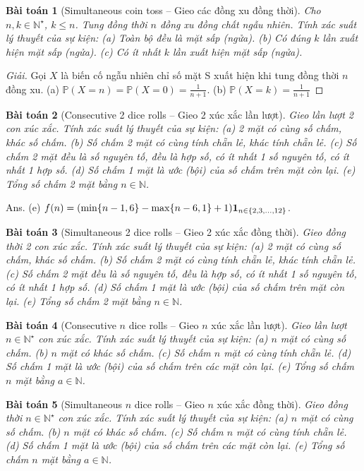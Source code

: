 \documentclass{article}
\newtheorem{baitoan}{Bài toán}
\begin{document}
\begin{baitoan}[Simultaneous coin toss -- Gieo các đồng xu đồng thời]
	Cho $n,k\in\mathbb{N}^\star$, $k\le n$. Tung đồng thời $n$ đồng xu đồng chất ngẫu nhiên. Tính xác suất lý thuyết của sự kiện: (a) Toàn bộ đều là mặt sấp (ngửa). (b) Có đúng $k$ lần xuất hiện mặt sấp (ngửa). (c) Có ít nhất $k$ lần xuất hiện mặt sấp (ngửa).
\end{baitoan}

\begin{proof}[Giải]
	Gọi $X$ là biến cố ngẫu nhiên chỉ số mặt S xuất hiện khi tung đồng thời $n$ đồng xu. (a) $\mathbb{P}(X = n) = \mathbb{P}(X = 0) = \frac{1}{n + 1}$. (b) $\mathbb{P}(X = k) = \frac{1}{n + 1}$
\end{proof}

\begin{baitoan}[Consecutive 2 dice rolls -- Gieo 2 xúc xắc lần lượt]
	Gieo lần lượt 2 con xúc xắc. Tính xác suất lý thuyết của sự kiện: (a) 2 mặt có cùng số chấm, khác số chấm. (b) Số chấm 2 mặt có cùng tính chẵn lẻ, khác tính chẵn lẻ. (c) Số chấm 2 mặt đều là số nguyên tố, đều là hợp số, có ít nhất 1 số nguyên tố, có ít nhất 1 hợp số. (d) Số chấm 1 mặt là ước (bội) của số chấm trên mặt còn lại. (e) Tổng số chấm 2 mặt bằng $n\in\mathbb{N}$.
\end{baitoan}
{\sf Ans.} (e) $f(n) = (\min\{n - 1, 6\} - \max\{n - 6,1\} + 1){\bf1}_{n\in\{2,3,\ldots,12\}}$.

\begin{baitoan}[Simultaneous 2 dice rolls -- Gieo 2 xúc xắc đồng thời]
	Gieo đồng thời 2 con xúc xắc. Tính xác suất lý thuyết của sự kiện: (a) 2 mặt có cùng số chấm, khác số chấm. (b) Số chấm 2 mặt có cùng tính chẵn lẻ, khác tính chẵn lẻ. (c) Số chấm 2 mặt đều là số nguyên tố, đều là hợp số, có ít nhất 1 số nguyên tố, có ít nhất 1 hợp số. (d) Số chấm 1 mặt là ước (bội) của số chấm trên mặt còn lại. (e) Tổng số chấm 2 mặt bằng $n\in\mathbb{N}$.
\end{baitoan}

\begin{baitoan}[Consecutive $n$ dice rolls -- Gieo $n$ xúc xắc lần lượt]
	Gieo lần lượt $n\in\mathbb{N}^\star$ con xúc xắc. Tính xác suất lý thuyết của sự kiện: (a) $n$ mặt có cùng số chấm. (b) $n$ mặt có khác số chấm. (c) Số chấm $n$ mặt có cùng tính chẵn lẻ. (d) Số chấm 1 mặt là ước (bội) của số chấm trên các mặt còn lại. (e) Tổng số chấm $n$ mặt bằng $a\in\mathbb{N}$.
\end{baitoan}

\begin{baitoan}[Simultaneous $n$ dice rolls -- Gieo $n$ xúc xắc đồng thời]
	Gieo đồng thời $n\in\mathbb{N}^\star$ con xúc xắc. Tính xác suất lý thuyết của sự kiện: (a) $n$ mặt có cùng số chấm. (b) $n$ mặt có khác số chấm. (c) Số chấm $n$ mặt có cùng tính chẵn lẻ. (d) Số chấm 1 mặt là ước (bội) của số chấm trên các mặt còn lại. (e) Tổng số chấm $n$ mặt bằng $a\in\mathbb{N}$.
\end{baitoan}
\end{document}
